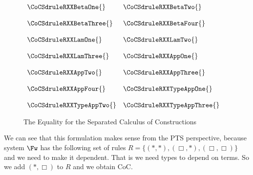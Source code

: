 \begin{figure}
  \begin{center}
    \begin{math}
      \begin{array}{lll}
        \CoCSdruleRXXBetaOne{} & \CoCSdruleRXXBetaTwo{}\\
        &\\
        \CoCSdruleRXXBetaThree{} & \CoCSdruleRXXBetaFour{}\\
        &\\
        \CoCSdruleRXXLamOne{} & \CoCSdruleRXXLamTwo{}\\
        &\\
        \CoCSdruleRXXLamThree{} & \CoCSdruleRXXAppOne{}\\
        &\\
        \CoCSdruleRXXAppTwo{} & \CoCSdruleRXXAppThree{}\\
        &\\
        \CoCSdruleRXXAppFour{} & \CoCSdruleRXXTypeAppOne{}\\
        &\\
        \CoCSdruleRXXTypeAppTwo{} & \CoCSdruleRXXTypeAppThree{}
      \end{array}
    \end{math}
  \end{center}
  \caption{The Equality for the Separated Calculus of Constructions}
  \label{fig:CoC_sep_red}
\end{figure}
We can see that this formulation makes sense from the PTS perspective,
because system $\Fw$ has the following set of rules $R = \{
(*,*),(\Box,*),(\Box,\Box)\}$ and we need to make it dependent.  That
is we need types to depend on terms.  So we add $(*,\Box)$ to $R$ and
we obtain CoC.  
